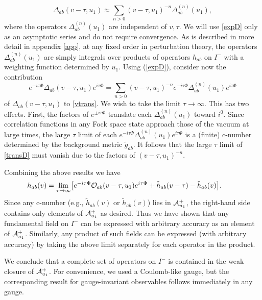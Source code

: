 \documentclass[12pt,onecolumn,eqsecnum,aps,prd,nofootinbib]{revtex4}
\def\be{\begin{equation}}
\def\ee{\end{equation}}
\begin{document}
\begin{equation}
\label{expD}
\Delta_{ab}(v-\tau,u_1) \approx \sum_{n >0} (v-\tau,u_1)^{-n} \Delta^{(n)}_{ab}(u_1),
\end{equation}
where the operators $\Delta^{(n)}_{ab}(u_1)$ are independent of $v, \tau$.  We will use \eqref{expD} only as an asymptotic series and do not require convergence.  As is described in more detail in appendix \ref{app}, at any fixed order in perturbation theory, the operators $\Delta^{(n)}_{ab}(u_1)$ are simply integrals over products of operators $h_{ab}$ on $I^-$ with a weighting function determined by $u_1$.  Using (\ref{expD}), consider now the contribution
\begin{equation}
\label{transD}
e^{-i \tau \Phi} \Delta_{ab}(v-\tau,u_1)e^{i \tau \Phi} =  \sum_{n > 0} (v-\tau,u_1)^{-n} e^{-i \tau \Phi} \Delta^{(n)}_{ab}(u_1) e^{i \tau \Phi}
\end{equation} of $\Delta_{ab}(v-\tau,u_1)$ to \eqref{vtrans}.  We wish to take the limit $\tau \rightarrow \infty$.  This has two effects.  First, the factors of
$e^{\pm i  \tau \Phi}$ translate each $\Delta^{(n)}_{ab}(u_1)$ toward $i^0$.  Since
correlation functions in any Fock space state approach those of the
vacuum at large times, the large $\tau$ limit of each $e^{-i \tau \Phi} \Delta^{(n)}_{ab}(u_1) e^{i \tau \Phi}$ is a (finite) c-number determined by the background metric $\tilde g_{ab}$.  It follows that the large $\tau$ limit of \eqref{transD} must vanish due to the factors of $(v-\tau,u_1)^{-n}.$


Combining the above results we have
 \be
  h_{ab}(v) = \lim_{\tau \rightarrow \infty} \bigl[ e^{-i \tau \Phi}{\cal O}_{ab}(v-\tau, u_1) e^{i \tau
\Phi} + \tilde h_{ab}(v - \tau) - \tilde h_{ab}(v) \bigr]. \ \ \ \ \ \ \
 \ee
Since any c-number (e.g., $\tilde h_{ab}(v)$ or $\tilde h_{ab}(v)$)  lies in ${\cal A}^+_{u_1}$, the right-hand side
contains only elements of ${\cal A}^+_{u_1}$ as desired.  Thus we have
shown that any fundamental field on $I^-$ can be expressed with
arbitrary accuracy as an element of ${\cal A}^+_{u_1}$.  Similarly,
any product of such fields can be expressed (with arbitrary
accuracy) by taking the above limit separately for each operator in
the product.

We conclude that a complete set of operators on $I^-$ is contained
in the weak closure of ${\cal A}^+_{u_1}$. For convenience, we used
a Coulomb-like gauge, but the corresponding result for
gauge-invariant observables follows immediately in any gauge.
\end{document}
